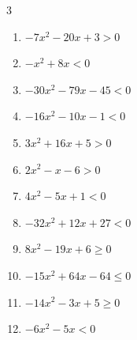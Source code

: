 \begin{multicols}{3}
\begin{enumerate}
  \item $-7x^{2}-20x+3>0$


  \item $-x^{2}+8x<0$

        \phantom{$\displaystyle x < 0 , \; 8 < x$}

\columnbreak %

\resetques

  \item $-30x^{2}-79x-45<0$


  \item $-16x^{2}-10x-1<0$


  \item $3x^{2}+16x+5>0$


  \item $2x^{2}-x-6>0$


  \item $4x^{2}-5x+1<0$


  \item $-32x^{2}+12x+27<0$


  \item $8x^{2}-19x+6\geq 0$


  \item $-15x^{2}+64x-64\leq 0$


  \item $-14x^{2}-3x+5\geq 0$


  \item $-6x^{2}-5x<0$



\end{enumerate}
\end{multicols}
